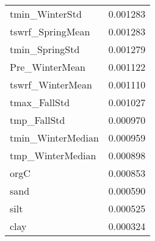 \begin{tabular}{lr}
tmin_WinterStd & 0.001283 \\
tswrf_SpringMean & 0.001283 \\
tmin_SpringStd & 0.001279 \\
Pre_WinterMean & 0.001122 \\
tswrf_WinterMean & 0.001110 \\
tmax_FallStd & 0.001027 \\
tmp_FallStd & 0.000970 \\
tmin_WinterMedian & 0.000959 \\
tmp_WinterMedian & 0.000898 \\
orgC & 0.000853 \\
sand & 0.000590 \\
silt & 0.000525 \\
clay & 0.000324 \\
\bottomrule
\end{tabular}
